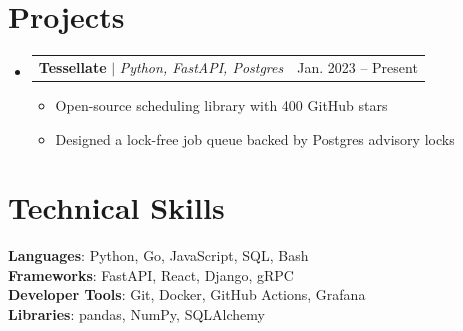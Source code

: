 \documentclass[letterpaper,11pt]{article}
\makeatletter
\newcommand{\resumeItem}[1]{
  \item\small{
    {#1 \vspace{-2pt}}
  }
}
\newcommand{\resumeProjectHeading}[2]{
    \item
    \begin{tabular*}{0.97\textwidth}{l@{\extracolsep{\fill}}r}
      \small#1 & #2 \\
    \end{tabular*}\vspace{-7pt}
}
\newcommand{\resumeSubHeadingListStart}{\begin{itemize}[leftmargin=0.15in, label={}]}
\newcommand{\resumeSubHeadingListEnd}{\end{itemize}}
\newcommand{\resumeItemListStart}{\begin{itemize}}
\newcommand{\resumeItemListEnd}{\end{itemize}\vspace{-5pt}}
\makeatother
\begin{document}
\section{Projects}
    \resumeSubHeadingListStart
      \resumeProjectHeading
          {\textbf{Tessellate} $|$ \emph{Python, FastAPI, Postgres}}{Jan. 2023 -- Present}
          \resumeItemListStart
            \resumeItem{Open-source scheduling library with 400 GitHub stars}
            \resumeItem{Designed a lock-free job queue backed by Postgres advisory locks}
          \resumeItemListEnd
    \resumeSubHeadingListEnd


\section{Technical Skills}
 \begin{itemize}[leftmargin=0.15in, label={}]
    \small{\item{
     \textbf{Languages}{: Python, Go, JavaScript, SQL, Bash} \\
     \textbf{Frameworks}{: FastAPI, React, Django, gRPC} \\
     \textbf{Developer Tools}{: Git, Docker, GitHub Actions, Grafana} \\
     \textbf{Libraries}{: pandas, NumPy, SQLAlchemy}
    }}
 \end{itemize}
\end{document}
